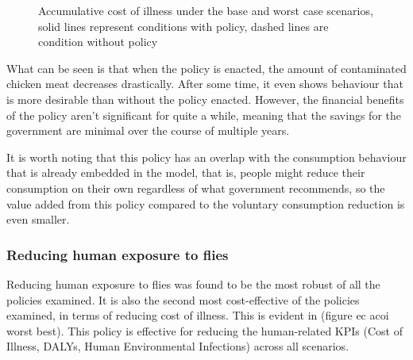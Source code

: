 \begin{figure}[h!]
\begin{minipage}{0.45\textwidth}
        \caption{Accumulative cost of illness under the base and worst case scenarios, solid lines represent conditions with policy, dashed lines are condition without policy}
        \label{fig:pc_bwc_acoi}
    \end{minipage}
\end{figure}

What can be seen is that when the policy is enacted, the amount of contaminated chicken meat decreases drastically. After some time, it even shows behaviour that is more desirable than without the policy enacted. However, the financial benefits of the policy aren't significant for quite a while, meaning that the savings for the government are minimal over the course of multiple years.

It is worth noting that this policy has an overlap with the consumption behaviour that is already embedded in the model, that is, people might reduce their consumption on their own regardless of what government recommends, so the value added from this policy compared to the voluntary consumption reduction is even smaller.

\subsubsection{Reducing human exposure to flies}
\label{reducing human exposure to flies}
Reducing human exposure to flies was found to be the most robust of all the policies examined. It is also the second most cost-effective of the policies examined, in terms of reducing cost of illness. This is evident in (figure ec acoi worst best). This policy is effective for reducing the human-related KPIs (Cost of Illness, DALYs, Human Environmental Infections) across all scenarios. 

